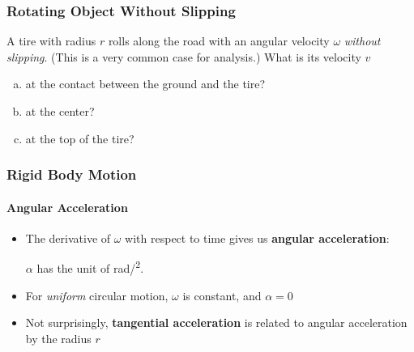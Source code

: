 \documentclass[12pt,compress,aspectratio=169]{beamer}
\newcommand{\eq}[2]{\vspace{#1}{\Large\begin{displaymath}#2\end{displaymath}}}
\begin{document}
\begin{frame}
  \frametitle{Rotating Object Without Slipping}
  A tire with radius $r$ rolls along the road with an angular velocity $\omega$
  \emph{without slipping}. (This is a very common case for analysis.)  What
  is its velocity $v$
  \begin{enumerate}[a.]
  \item at the contact between the ground and the tire?
  \item at the center?
  \item at the top of the tire?
  \end{enumerate}

  \vspace{-.4in}
  \begin{center}
    \hspace{1in}
  \end{center}
\end{frame}

\begin{frame}
  \frametitle{Rigid Body Motion}
  \framesubtitle{Angular Acceleration}
  \begin{itemize}
  \item The derivative of $\omega$ with respect to time gives us
    \textbf{angular acceleration}:

    \eq{-.2in}{
      \boxed{\alpha=\frac{d\omega(t)}{dt}=\frac{d^2\theta(t)}{dt^2}}
    }

    \vspace{-.1in}$\alpha$ has the unit of \si{rad/\sec^2}.

  \item For \emph{uniform} circular motion, $\omega$ is constant, and $\alpha=0$
  \item Not surprisingly, \textbf{tangential acceleration} is related to
    angular acceleration by the radius $r$
    
    \eq{-.2in}{
      \boxed{a_\theta=\frac{dv}{dt}=r\frac{d\omega(t)}{dt}=r\alpha}
    }

  \end{itemize}
\end{frame}
\end{document}
